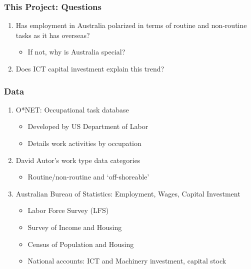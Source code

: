 \documentclass[red]{beamer}
\begin{document}
\begin{frame}
  \frametitle{This Project: Questions}
  \begin{enumerate}
  \item  Has employment in Australia polarized in terms of routine and non-routine tasks as it has overseas?
    \begin{itemize}
    \item If not, why is Australia special?
    \end{itemize}
    \vspace{1cm}
  \item Does ICT capital investment explain this trend?
  \end{enumerate}
\end{frame}

\begin{frame}
  \frametitle{Data}
  \begin{enumerate}
  \item O*NET: Occupational task database
    \begin{itemize}
    \item Developed by US Department of Labor
    \item Details work activities by occupation
    \end{itemize}
    \vspace{10pt}
  \item David Autor's work type data categories
    \begin{itemize}
    \item Routine/non-routine and `off-shoreable'
    \end{itemize}
    \vspace{10pt}
  \item Australian Bureau of Statistics: Employment, Wages, Capital Investment
    \begin{itemize}
    \item Labor Force Survey (LFS)
    \item Survey of Income and Housing
    \item Census of Population and Housing
    \item National accounts: ICT and Machinery investment, capital stock
    \end{itemize}
  \end{enumerate}
\end{frame}
\end{document}

